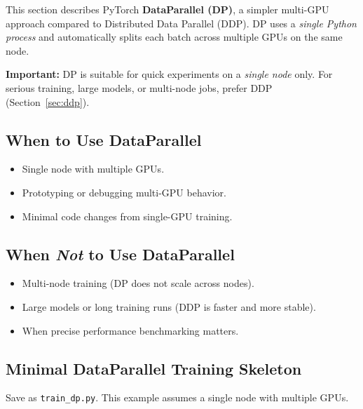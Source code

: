 \documentclass[11pt]{article}
\begin{document}
This section describes PyTorch \textbf{DataParallel (DP)}, a simpler multi-GPU
approach compared to Distributed Data Parallel (DDP).
DP uses a \emph{single Python process} and automatically splits each batch across
multiple GPUs on the same node.

\textbf{Important:} DP is suitable for quick experiments on a \emph{single node}
only. For serious training, large models, or multi-node jobs, prefer DDP
(Section~\ref{sec:ddp}).

\subsection{When to Use DataParallel}
\begin{itemize}[leftmargin=*]
  \item Single node with multiple GPUs.
  \item Prototyping or debugging multi-GPU behavior.
  \item Minimal code changes from single-GPU training.
\end{itemize}

\subsection{When \emph{Not} to Use DataParallel}
\begin{itemize}[leftmargin=*]
  \item Multi-node training (DP does not scale across nodes).
  \item Large models or long training runs (DDP is faster and more stable).
  \item When precise performance benchmarking matters.
\end{itemize}

\subsection{Minimal DataParallel Training Skeleton}
Save as \texttt{train\_dp.py}. This example assumes a single node with multiple GPUs.
\end{document}
